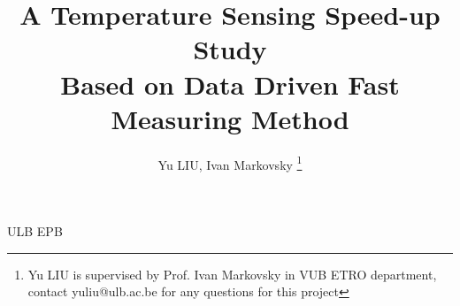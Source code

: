 \documentclass[journal]{IEEEtran}
\begin{document}
%
\title{A Temperature Sensing Speed-up Study \\ Based on Data Driven Fast Measuring Method}
%
%
%

\author{Yu LIU,
        Ivan Markovsky
\thanks{Yu LIU is supervised by Prof. Ivan Markovsky in VUB ETRO department, contact yuliu@ulb.ac.be for any questions for this project}}

% 
%



%
{ULB EPB}

\maketitle
\end{document}
